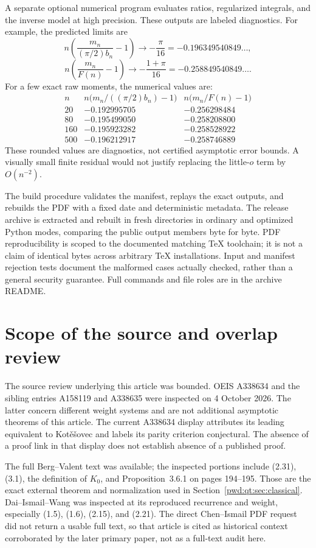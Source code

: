 \documentclass[11pt,letterpaper]{article}
\numberwithin{equation}{section}
\theoremstyle{remark}\newtheorem{remark}[theorem]{Remark}
\begin{document}
A separate optional numerical program evaluates ratios, regularized integrals, and the inverse model at high precision. These outputs are labeled diagnostics. For example, the predicted limits are
\[
 n\left(\frac{m_n}{(\pi/2)b_n}-1\right)\longrightarrow-\frac\pi{16}
     =-0.196349540849\ldots,
\]
\[
 n\left(\frac{m_n}{F(n)}-1\right)\longrightarrow-\frac{1+\pi}{16}
     =-0.258849540849\ldots.
\]
For a few exact raw moments, the numerical values are:
\[
\begin{array}{r|rr}
 n&n\bigl(m_n/((\pi/2)b_n)-1\bigr)&n\bigl(m_n/F(n)-1\bigr)\\ \hline
20&-0.192995705&-0.256298484\\
80&-0.195499050&-0.258208800\\
160&-0.195923282&-0.258528922\\
500&-0.196212917&-0.258746889
\end{array}
\]
These rounded values are diagnostics, not certified asymptotic error bounds. A visually small finite residual would not justify replacing the little-$o$ term by $O(n^{-2})$.

The build procedure validates the manifest, replays the exact outputs, and rebuilds the PDF with a fixed date and deterministic metadata. The release archive is extracted and rebuilt in fresh directories in ordinary and optimized Python modes, comparing the public output members byte for byte. PDF reproducibility is scoped to the documented matching TeX toolchain; it is not a claim of identical bytes across arbitrary TeX installations. Input and manifest rejection tests document the malformed cases actually checked, rather than a general security guarantee. Full commands and file roles are in the archive README.

\section{Scope of the source and overlap review}\label{pwd:qt:sec:sources}
The source review underlying this article was bounded. OEIS A338634 and the sibling entries A158119 and A338635 were inspected on 4 October 2026. The latter concern different weight systems and are not additional asymptotic theorems of this article. The current A338634 display attributes its leading equivalent to Kot\v e\v sovec and labels its parity criterion conjectural. The absence of a proof link in that display does not establish absence of a published proof.

The full Berg--Valent text was available; the inspected portions include (2.31), (3.1), the definition of $K_0$, and Proposition~3.6.1 on pages 194--195. Those are the exact external theorem and normalization used in Section~\ref{pwd:qt:sec:classical}. Dai--Ismail--Wang \cite{dai} was inspected at its reproduced recurrence and weight, especially (1.5), (1.6), (2.15), and (2.21). The direct Chen--Ismail PDF request did not return a usable full text, so that article is cited as historical context corroborated by the later primary paper, not as a full-text audit here.
\end{document}
